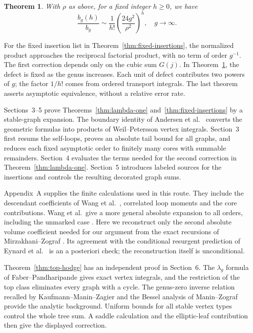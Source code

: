 \documentclass[a4paper,10pt]{article}
\numberwithin{equation}{section}
\theoremstyle{paperplain}
\newtheorem{thm}{Theorem}[section]
\theoremstyle{paperremark}
\theoremstyle{paperplain}
\begin{document}
\begin{thm}
\label{thm:fixed-defect}
With $\rho$ as above, for a fixed integer $h\geq0$, we have
\begin{equation}
\frac{b_g(h)}{b_g}\sim \frac{1}{h!}\left(\frac{24g^2}{\rho^2}\right)^h,\quad g\to\infty.
\label{eq:gh11}
\end{equation}
\end{thm}

For the fixed insertion list in
Theorem~\ref{thm:fixed-insertions}, the normalized product
approaches the reciprocal factorial product, with no term of order
$g^{-1}$. The first correction depends only on the cubic sum
$G(j)$. In Theorem~\ref{thm:fixed-defect}, the defect is fixed as
the genus increases. Each unit of defect contributes two powers
of $g$; the factor $1/h!$ comes from ordered transport integrals.
The last theorem asserts asymptotic equivalence, without a relative
error rate.

Sections~3--5 prove Theorems~\ref{thm:lambda-one}
and~\ref{thm:fixed-insertions} by a stable-graph expansion.
The boundary identity of Andersen et al.\
\cite[Lemma 3.10]{ABCDGLW23} converts the geometric formulas into
products of Weil--Petersson vertex integrals. Section~3 first
resums the self-loops, proves an absolute tail bound for all graphs,
and reduces each fixed asymptotic order to finitely many cores
with summable remainders. Section~4 evaluates the terms needed
for the second correction in Theorem~\ref{thm:lambda-one}.
Section~5 introduces labeled sources for the insertions and
controls the resulting decorated graph sums.

Appendix~A supplies the finite calculations used in this route.
They include the descendant coefficients of Wang et al.\
\cite[Lemma 7.2 and Appendix C.1]{W26}, correlated loop moments
and the core contributions. Wang et al.\ give a more general
absolute expansion to all orders, including the unmarked case
\cite[Theorem~1.1 and (11.6)--(11.7)]{W26v5}.
Here we reconstruct only the second absolute volume coefficient
needed for our argument from the exact recursions of
Mirzakhani--Zograf \cite[\S 2]{MZ15}. Its agreement with the
conditional resurgent prediction of Eynard et al.\
\cite[\S 6.1, (6.10)]{EGGLS24} is an a posteriori check;
the reconstruction itself is unconditional.

Theorem~\ref{thm:top-hodge} has an independent proof in Section~6.
The $\lambda_g$ formula of Faber--Pandharipande
\cite[Theorem 1]{FP03} gives exact vertex integrals, and the
restriction of the top class eliminates every graph with a cycle.
The genus-zero inverse relation recalled by Kaufmann--Manin--Zagier
\cite[(0.8)]{KMZ96v1} and the Bessel analysis of Manin--Zograf
\cite[\S 6, (17) and Proof 6.3]{MaZ00} provide the analytic
background. Uniform bounds for all stable vertex types control
the whole tree sum. A saddle calculation and the elliptic-leaf
contribution then give the displayed correction.
\end{document}
